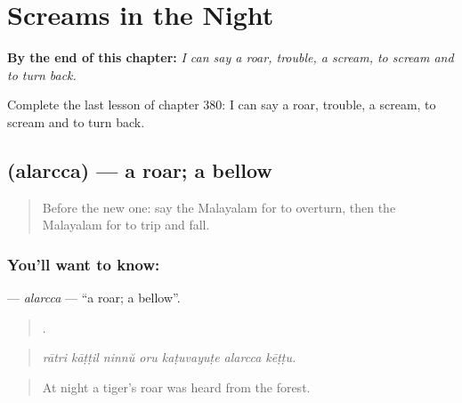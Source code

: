 
\chapter{Screams in the Night}
\label{ch:ml-screams-in-the-night}

\begin{chapteropening}
\textbf{By the end of this chapter:} \emph{I can say a roar, trouble, a scream, to scream and to turn back.}

Complete the last lesson of chapter 380: I can say a roar, trouble, a scream, to scream and to turn back.
\end{chapteropening}

\section[\texorpdfstring{\ml{അലർച്ച} (alarcca)}{അലർച്ച (alarcca)}]{ (alarcca) — a roar; a bellow}

\label{lesson:ML-C380-alarcca}



\begin{quote}
Before the new one: say the Malayalam for to overturn, then the Malayalam for to trip and fall.
\end{quote}

\subsection*{You'll want to know: }
\textbf{} — \emph{alarcca} — \textquotedblleft{}a roar; a bellow\textquotedblright{}.

\begin{quote}
      .
\end{quote}

\begin{quote}
\emph{rātri kāṭṭil ninnŭ oru kaṭuvayuṭe alarcca kēṭṭu.}
\end{quote}

\begin{quote}
At night a tiger's roar was heard from the forest.
\end{quote}

